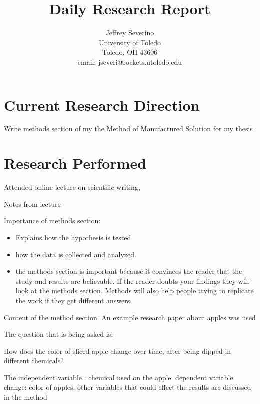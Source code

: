 \documentclass[a4paper]{article}
\begin{document}
\begin{titlepage}

    \title{
    Daily Research Report}

    \author{ Jeffrey Severino \\
        University of Toledo \\
        Toledo, OH  43606 \\
    email: jseveri@rockets.utoledo.edu}


    \maketitle

\end{titlepage}
\section{Current Research Direction}
Write methods section of my the Method of Manufactured Solution for my thesis

\section{Research Performed}
Attended online lecture on scientific writing,

Notes from lecture

Importance of methods section:
\begin{itemize}
    \item Explains how the hypothesis is tested
    \item how the data is collected and analyzed.
    \item the methods section is important because it convinces the reader 
        that the study and results are believable. If the reader doubts your 
        findings they will look at the methods section. Methods will also help people
        trying to replicate the work if they get different answers.  
\end{itemize}

Content of the method section. An example research paper about apples was used

The question that is being asked is:

How does the color of sliced apple change over time, after being dipped in different 
chemicals?

The independent variable : chemical used on the apple. dependent variable 
change: color of apples.  other variables that could effect the results are discussed 
in the method
\end{document}
